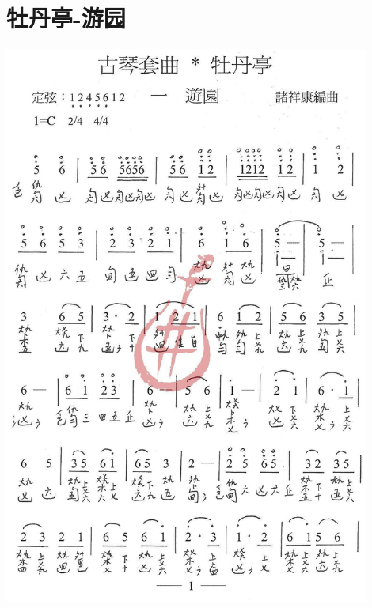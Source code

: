 \documentclass[cn,pad,twocol]{elegantbook}
\begin{document}
\section{牡丹亭-游园}
\paragraph*{\includegraphics[width=0.9\textwidth]{mudanting/2021-牡丹亭-01游园}} 
\end{document}
